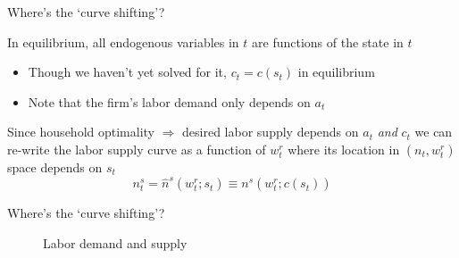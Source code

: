 

\begin{frame}{Where's the `curve shifting'?}

In equilibrium, all endogenous variables in $t$ are functions of the state in $t$
\begin{itemize}
\item	Though we haven't yet solved for it, $c_{t} = c(s_{t})$ in equilibrium
\item	Note that the firm's labor demand only depends on $a_{t}$
\end{itemize}

\vspace{4mm}
Since household optimality $\Rightarrow$ desired labor supply depends on $a_{t}$ \textit{and} $c_{t}$ we can re-write the labor supply curve as a function of $w_{t}^{r}$ where its location in $(n_{t},w_{t}^{r})$ space depends on $s_{t}$
\[
n^{s}_{t} = \hat{n}^{s}(w_{t}^{r};s_{t}) \equiv n^{s}(w_{t}^{r};c(s_{t}))
\]

\end{frame}



\begin{frame}{Where's the `curve shifting'?}

\begin{figure}[!htb]
\caption[Labor demand and supply]{\label{fig:lab_mkt} Labor demand and supply}
\end{figure}

\end{frame}

